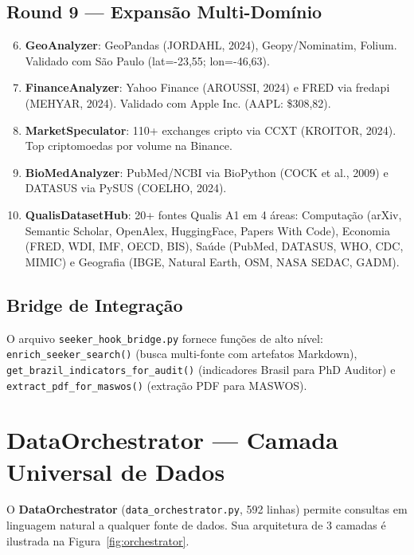 \documentclass[12pt,a4paper]{article}
\begin{document}
\subsection{Round 9 --- Expansão Multi-Domínio}

\begin{enumerate}[itemsep=2pt]
  \setcounter{enumi}{5}
  \item \textbf{GeoAnalyzer}: GeoPandas (JORDAHL, 2024), Geopy/Nominatim, Folium. Validado com São Paulo (lat=-23,55; lon=-46,63).
  \item \textbf{FinanceAnalyzer}: Yahoo Finance (AROUSSI, 2024) e FRED via fredapi (MEHYAR, 2024). Validado com Apple Inc. (AAPL: \$308,82).
  \item \textbf{MarketSpeculator}: 110+ exchanges cripto via CCXT (KROITOR, 2024). Top criptomoedas por volume na Binance.
  \item \textbf{BioMedAnalyzer}: PubMed/NCBI via BioPython (COCK et al., 2009) e DATASUS via PySUS (COELHO, 2024).
  \item \textbf{QualisDatasetHub}: 20+ fontes Qualis A1 em 4 áreas: Computação (arXiv, Semantic Scholar, OpenAlex, HuggingFace, Papers With Code), Economia (FRED, WDI, IMF, OECD, BIS), Saúde (PubMed, DATASUS, WHO, CDC, MIMIC) e Geografia (IBGE, Natural Earth, OSM, NASA SEDAC, GADM).
\end{enumerate}

\subsection{Bridge de Integração}

O arquivo \texttt{seeker\_hook\_bridge.py} fornece funções de alto nível: \texttt{enrich\_seeker\_search()} (busca multi-fonte com artefatos Markdown), \texttt{get\_brazil\_indicators\_for\_audit()} (indicadores Brasil para PhD Auditor) e \texttt{extract\_pdf\_for\_maswos()} (extração PDF para MASWOS).

\section{DataOrchestrator --- Camada Universal de Dados}

O \textbf{DataOrchestrator} (\texttt{data\_orchestrator.py}, 592 linhas) permite consultas em linguagem natural a qualquer fonte de dados. Sua arquitetura de 3 camadas é ilustrada na Figura~\ref{fig:orchestrator}.
\end{document}
